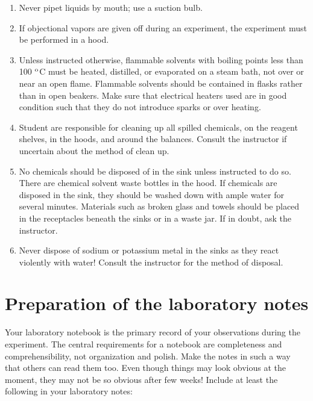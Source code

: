 \documentclass[byrevtex,amssymb,aps,pra,floatfix,letterpaper]{revtex4}
\begin{document}
\begin{enumerate}
\begin{enumerate}
\item Never pipet liquids by mouth; use a suction bulb.
\item If objectional vapors are given off during an experiment, the experiment must be performed in a hood.
\item Unless instructed otherwise, flammable solvents with boiling points less than 100 $^\textnormal{o}$C must be heated, distilled, or evaporated on a steam bath, not over or near an open flame. Flammable solvents should be contained in flasks rather than in open beakers. Make sure that electrical heaters used are in good condition such that they do not introduce sparks or over heating.
\item Student are responsible for cleaning up all spilled chemicals, on the reagent shelves, in the hoods, and around the balances. Consult the instructor if uncertain about the method of clean up.
\item No chemicals should be disposed of in the sink unless instructed to do so. There are chemical solvent waste bottles in the hood. If chemicals are disposed in the sink, they should be washed down with ample water for several minutes. Materials such as broken glass and towels should be placed in the receptacles beneath the sinks or in a waste jar. If in doubt, ask the instructor.
\item Never dispose of sodium or potassium metal in the sinks as they react violently with water! Consult the instructor for the method of disposal.
\end{enumerate}
\end{enumerate}

\section{Preparation of the laboratory notes}
\label{sec3}

Your laboratory notebook is the primary record of your observations during the experiment. The central requirements for a notebook are completeness and comprehensibility, not organization and polish. Make the notes in such a way that others can read them too. Even though things may look obvious at the moment, they may not be so obvious after few weeks! Include at least the following in your laboratory notes:
\end{document}
